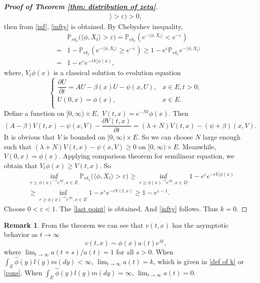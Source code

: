 \documentclass[12pt,a4paper]{amsart}
\theoremstyle{plain}
\theoremstyle{definition}
\newtheorem{rem}[thm]{Remark}
\numberwithin{equation}{section}
\begin{document}
\begin{proof}[{\bf Proof of Theorem \ref{thm: distribution of zeta}}]
\begin{eqnarray}
	\rangle >\varepsilon\big)>0,
\end{eqnarray}
	then from \eqref{inf}, \eqref{infty} is obtained.  By Chebyshev inequality,
\begin{eqnarray*}
	&&\mathbb P_{r\delta_x}\big(\langle\phi, X_t\rangle >\varepsilon\big)=\mathbb P_{r\delta_x}\left(e^{-\langle\phi, X_t\rangle }<e^{-\varepsilon}\right)\\
	&=&1-\mathbb P_{r\delta_x}\left(e^{-\langle\phi, X_t
	\rangle }\geq e^{-\varepsilon}\right)\geq 1-e^{\varepsilon }\mathbb P_{r\delta_x}e^{-\langle\phi, X_t\rangle }\\
	&=&1-e^{\varepsilon }e^{-rV_t\phi(x)},
\end{eqnarray*}
	where, $V_t\phi(x)$ is a classical solution to evolution equation
\begin{equation}\label{eq diff}
\begin{cases}
	\dfrac{\partial U}{\partial t}=AU-\beta(x)U-\psi(x, U),& x\in E, t>0;\\
	U(0,x)=\phi(x),& x\in E.\\
\end{cases}
\end{equation}
	Define a function on $[0,\infty)\times E,$ $V(t,x)=e^{-Nt}\phi(x).$  Then
\[
	(A-\beta)V(t,x)-\psi(x, V)-\frac{\partial V(t,x)}{\partial t}=(\lambda +N)V(t,x)-(\psi+\beta)(x,V).
\]
	It is obvious that $V$ is bounded on $[0,\infty)\times E$.  So we can choose $N$ large enough such that $(\lambda+N)V(t,x)-\psi(x,V)\geq 0$ on $[0,\infty)\times E.$
	Meanwhile, $V(0,x)=\phi(x)$.  Applying comparison theorem for semilinear equation, we obtain that $V_t\phi(x)\geq V(t,x)$.  So
\begin{eqnarray*}
	&&\inf_{r\geq \phi(x)^{-1}e^{Nt}, x\in E}\mathbb P_{r\delta_x}\big(\langle\phi, X_t \rangle >\varepsilon\big)\geq \inf_{r\geq \phi(x)^{-1}e^{Nt}, x\in D} 1-e^{\varepsilon}e^{-rV_t\phi(x)}\\
    &&\geq \inf_{r\geq \phi(x)^{-1}e^{Nt}, x\in E} 1-e^{\varepsilon}e^{-rV(t,x)}
     \geq 1-e^{\varepsilon-1}.
\end{eqnarray*}
	Choose $0<\varepsilon<1.$  The \eqref{last point} is obtained. And
\eqref{infty} follows. Thus $k=0$.
\end{proof}

\begin{rem}
 From the theorem we can see that $v(t,x)$  has the asymptotic behavior as $t\to\infty$
 \[
 v(t,x)\sim \phi(x)a(t)e^{\lambda t},
 \]
 where $\lim_{t\rightarrow\infty}a(t+s)/a(t)=1$ for all $s>0$.  When $\int_E\hat\phi(y)l(y)m(dy)<\infty$, $\lim_{t\rightarrow\infty}a(t)=k$, which is given in \eqref{def of k} or \eqref{cons}.  When $\int_E\hat\phi(y)l(y)m(dy)=\infty$, $\lim_{t\rightarrow\infty}a(t)=0$.
 \end{rem}
\end{document}

